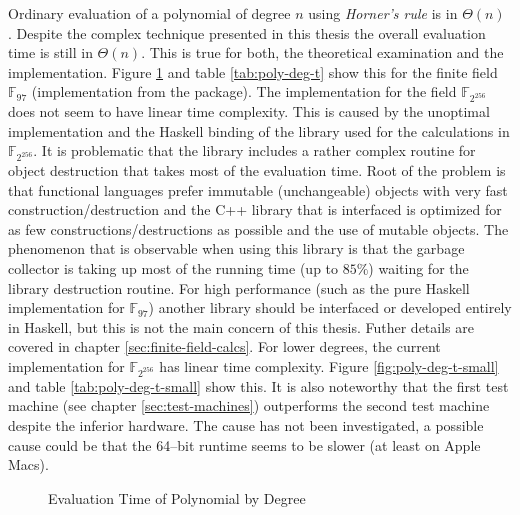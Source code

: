 %
%
\label{sec:comp-complexity}

Ordinary evaluation of a polynomial of degree $n$ using \emph{Horner's rule} is
in $\Theta(n)$ \cite{cormen01}. Despite the complex technique presented in this
thesis the overall evaluation time is still in $\Theta(n)$. This is true for
both, the theoretical examination and the implementation. Figure
\ref{fig:poly-deg-t} and table \ref{tab:poly-deg-t} show this for the finite
field $\mathbb{F}_{97}$ (implementation from the \JWTLhaskellForMaths{}
package). The implementation for the field $\mathbb{F}_{2^{256}}$ does not seem
to have linear time complexity. This is caused by the unoptimal implementation
and the Haskell binding of the library used for the calculations in
$\mathbb{F}_{2^{256}}$. It is problematic that the library includes a rather
complex routine for object destruction that takes most of the evaluation time.
Root of the problem is that functional languages prefer immutable (unchangeable)
objects with very fast construction/destruction and the C++ library that is
interfaced is optimized for as few constructions/destructions as possible and
the use of mutable objects. The phenomenon that is observable when using this
library is that the garbage collector is taking up most of the running time (up
to $85\%$) waiting for the library destruction routine. For high performance
(such as the pure Haskell implementation for $\mathbb{F}_{97}$) another library
should be interfaced or developed entirely in Haskell, but this is not the main
concern of this thesis. Futher details are covered in chapter
\ref{sec:finite-field-calcs}. For lower degrees, the current implementation for
$\mathbb{F}_{2^{256}}$ has linear time complexity. Figure
\ref{fig:poly-deg-t-small} and table \ref{tab:poly-deg-t-small} show this. It is
also noteworthy that the first test machine (see chapter
\ref{sec:test-machines}) outperforms the second test machine despite the
inferior hardware. The cause has not been investigated, a possible cause could
be that the 64--bit \JWTghc{} runtime seems to be slower (at least on Apple
Macs)\cite{lentczner11}.


\begin{figure}[ht]
  \centering
  
  \caption{Evaluation Time of Polynomial by Degree}
  \label{fig:poly-deg-t}
\end{figure}

